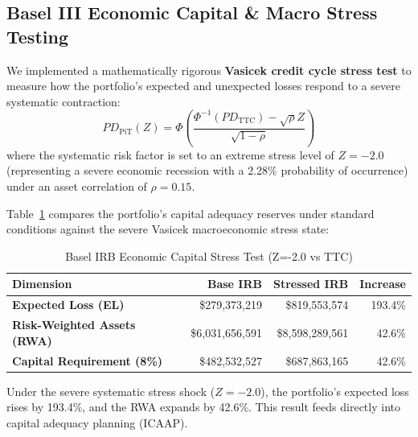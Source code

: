 \documentclass[11pt,a4paper]{article}
\begin{document}
\subsection{Basel III Economic Capital \& Macro Stress Testing}
We implemented a mathematically rigorous \textbf{Vasicek credit cycle stress test} \parencite{engelmann2011} to measure how the portfolio's expected and unexpected losses respond to a severe systematic contraction:
\begin{equation}
PD_{\text{PiT}}(Z) = \Phi\left( \frac{\Phi^{-1}(PD_{\text{TTC}}) - \sqrt{\rho} Z}{\sqrt{1 - \rho}} \right)
\end{equation}
where the systematic risk factor is set to an extreme stress level of $Z = -2.0$ (representing a severe economic recession with a 2.28\% probability of occurrence) under an asset correlation of $\rho = 0.15$.

Table~\ref{tab:stress_testing} compares the portfolio's capital adequacy reserves under standard conditions against the severe Vasicek macroeconomic stress state:

\begin{table}[h]
    \centering
    \caption{Basel IRB Economic Capital Stress Test (Z=-2.0 vs TTC)}
    \label{tab:stress_testing}
    \vspace{0.5em}
    \begin{tabular}{lrrr}
        \toprule
        \textbf{Dimension} & \textbf{Base IRB} & \textbf{Stressed IRB} & \textbf{Increase} \\
        \midrule
        \textbf{Expected Loss (EL)} & \$279,373,219 & \$819,553,574 & 193.4\% \\
        \textbf{Risk-Weighted Assets (RWA)} & \$6,031,656,591 & \$8,598,289,561 & 42.6\% \\
        \textbf{Capital Requirement (8\%)} & \$482,532,527 & \$687,863,165 & 42.6\% \\
        \bottomrule
    \end{tabular}
\end{table}

Under the severe systematic stress shock ($Z = -2.0$), the portfolio's expected loss rises by 193.4\%, and the RWA expands by 42.6\%. This result feeds directly into capital adequacy planning (ICAAP).
\end{document}
